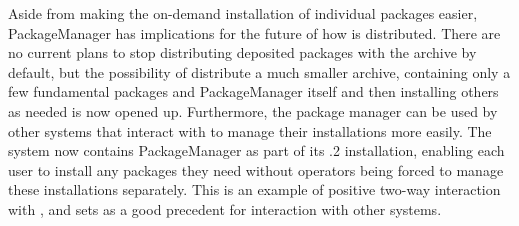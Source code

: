 Aside from making the on-demand installation of individual packages easier, {\sf
  PackageManager} has implications for the future of how \GAP is distributed.
There are no current plans to stop distributing
deposited packages with the \GAP archive by default, but the
possibility of distribute a much smaller archive, containing only a few
fundamental packages and {\sf
  PackageManager} itself and then installing others as needed is now
opened up.  Furthermore, the package manager
can be used by other systems that interact with \GAP to manage
their \GAP installations more easily.  The \cocalc system now contains {\sf PackageManager}
as part of its .2 installation, enabling each user to install any
packages they need without \cocalc operators being forced to manage these
installations separately.  This is an example of positive two-way interaction
with \cocalc, and sets as a good precedent for interaction with other
systems.

